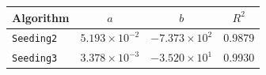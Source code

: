 \begin{tabular}{lccc}
    \toprule
    Algorithm & $a$ & $b$ & $R^{2}$ \\
    \midrule
    \texttt{Seeding2} & $5.193\times10^{-2}$ & $-7.373\times10^{2}$ & 0.9879 \\
    \texttt{Seeding3} & $3.378\times10^{-3}$ & $-3.520\times10^{1}$ & 0.9930 \\
    \bottomrule
\end{tabular}

